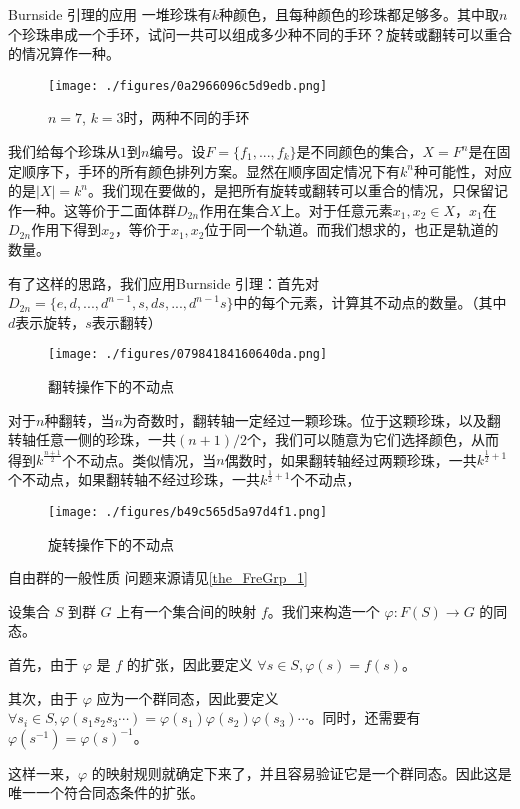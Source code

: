 \begin{example}{Burnside 引理的应用}
一堆珍珠有$k$种颜色，且每种颜色的珍珠都足够多。其中取$n$个珍珠串成一个手环，试问一共可以组成多少种不同的手环？旋转或翻转可以重合的情况算作一种。

\begin{figure}[ht]
\centering
\texttt{[image: ./figures/0a2966096c5d9edb.png]}
\caption{$n=7$, $k=3$时，两种不同的手环} \label{fig_GroupP_1}
\end{figure}

我们给每个珍珠从$1$到$n$编号。设$F=\{f_1,...,f_k\}$是不同颜色的集合，$X=F^n$是在固定顺序下，手环的所有颜色排列方案。显然在顺序固定情况下有$k^n$种可能性，对应的是$|X|=k^n$。我们现在要做的，是把所有旋转或翻转可以重合的情况，只保留记作一种。这等价于二面体群$D_{2n}$作用在集合$X$上。对于任意元素$x_1,x_2\in X$，$x_1$在$D_{2n}$作用下得到$x_2$，等价于$x_1,x_2$位于同一个轨道。而我们想求的，也正是轨道的数量。

有了这样的思路，我们应用Burnside 引理：首先对$D_{2n}=\{e,d,...,d^{n-1},s,ds,...,d^{n-1}s\}$中的每个元素，计算其不动点的数量。（其中$d$表示旋转，$s$表示翻转）

\begin{figure}[ht]
\centering
\texttt{[image: ./figures/07984184160640da.png]}
\caption{翻转操作下的不动点} \label{fig_GroupP_2}
\end{figure}

对于$n$种翻转，当$n$为奇数时，翻转轴一定经过一颗珍珠。位于这颗珍珠，以及翻转轴任意一侧的珍珠，一共$(n+1)/2$个，我们可以随意为它们选择颜色，从而得到$k^\frac{n+1}{2}$个不动点。类似情况，当$n$偶数时，如果翻转轴经过两颗珍珠，一共$k^{\frac{1}{2}+1}$个不动点，如果翻转轴不经过珍珠，一共$k^{\frac{1}{2}+1}$个不动点，

\begin{figure}[ht]
\centering
\texttt{[image: ./figures/b49c565d5a97d4f1.png]}
\caption{旋转操作下的不动点} \label{fig_GroupP_3}
\end{figure}
\end{example}




\begin{example}{自由群的一般性质}\label{ex_GroupP_4}
问题来源请见\autoref{the_FreGrp_1}~

设集合 $S$ 到群 $G$ 上有一个集合间的映射 $f$。我们来构造一个 $\varphi: F(S)\rightarrow G$ 的同态。

首先，由于 $\varphi$ 是 $f$ 的扩张，因此要定义 $\forall s\in S, \varphi(s)=f(s)$。

其次，由于 $\varphi$ 应为一个群同态，因此要定义 $\forall s_i\in S, \varphi({s_1s_2s_3\cdots})=\varphi(s_1)\varphi(s_2)\varphi(s_3)\cdots$。同时，还需要有 $\varphi(s^{-1})=\varphi(s)^{-1}$。

这样一来，$\varphi$ 的映射规则就确定下来了，并且容易验证它是一个群同态。因此这是唯一一个符合同态条件的扩张。


\end{example}
